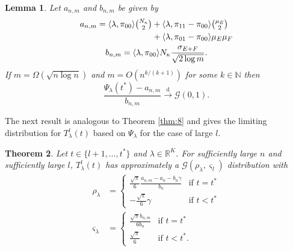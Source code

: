 \documentclass[10pt,journal,compsoc]{IEEEtran}
\newtheorem{theorem}{Theorem}
\newtheorem{lemma}[theorem]{Lemma}
\theoremstyle{definition}
\begin{document}
\begin{lemma}
  \label{lem:6}
  Let $a_{n,m}$ and $b_{n,m}$ be given by
  \begin{gather}
    \label{eq:28}
    \begin{split}
    a_{n,m} =%
\langle \lambda, \pi_{00} \rangle \tbinom{N_\kappa}{2} &+
\langle \lambda, \pi_{11} - \pi_{00} \rangle
\tbinom{\mu_E}{2} \\ &+ \langle \lambda, \pi_{01} - \pi_{00} \rangle \mu_E \mu_F 
    \end{split} \\
    b_{n,m} = \langle \lambda, \pi_{00} \rangle N_\kappa \frac{\sigma_{E + F}}{\sqrt{2
        \log{m}}}.
  \end{gather}
  If $m = \Omega(\sqrt{n \log n})$ and $m = O(n^{k/(k+1)})$ for some
  $k \in \mathbb{N}$ then
  \begin{equation}
    \label{eq:29}
    \frac{\Psi_{\lambda}(t^{*}) - a_{n,m}}{b_{n,m}}
    \overset{\mathrm{d}}{\longrightarrow} \mathcal{G}(0,1).
  \end{equation}
\end{lemma}
The next result is analogous to Theorem \ref{thm:8} and gives 
the limiting distribution for
$T_{\lambda}^{l}(t)$ based on $\Psi_{\lambda}$ for the case of large
$l$.
\begin{theorem}
  \label{thm:6}
  Let $t \in \{l+1, \dots, t^{*}\} $ and $\lambda \in
  \mathbb{R}^{K}$. For sufficiently large $n$ and sufficiently large
  $l$, $T_{\lambda}^{l}(t)$ has approximately a
  $\mathcal{G}(\rho_{\lambda}, \varsigma_{l})$ distribution with
  \begin{align}
    \label{eq:52}
    \rho_{\lambda} &= \begin{cases}
      \tfrac{\sqrt{\pi}}{6} \tfrac{a_{n,m} - a_n - b_n \gamma}{b_n} & \text{if
        $t = t^{*}$} \\
      - \tfrac{\sqrt{\pi}}{6} \gamma & \text{if $t < t^{*}$} 
    \end{cases} \\
      \varsigma_{\lambda} &= \begin{cases}
        \tfrac{\sqrt{\pi} b_{n,m}}{6 b_n} & \text{if $t = t^{*}$} \\
        \tfrac{\sqrt{\pi}}{6} & \text{if $t < t^{*}$}.
      \end{cases}
  \end{align}
\end{theorem}
\end{document}

